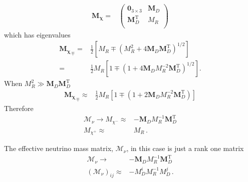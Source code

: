 \begin{align}
  \boldsymbol{M_{\chi}}=& \begin{pmatrix}
   \mathbf{0}_{3 \times 3} &            \boldsymbol{M}_D \\
   \boldsymbol{M}_D^{\operatorname{T}} & M_R \\
 \end{pmatrix}
\end{align}
which has eigenvalues
\begin{align}
{  \boldsymbol{M_{\chi}}}_\mp=&\frac{1}{2} \left[ M_R \mp \left( M_R^2 + 4   \boldsymbol{M}_D   \boldsymbol{M}_D^{\operatorname{T}}  \right)^{1/2} \right] \nonumber\\
  =&\frac{1}{2} M_R\left[ 1 \mp  \left( 1 + 4   \boldsymbol{M}_D M_R^{-2}   \boldsymbol{M}_D ^{\operatorname{T}}  \right)^{1/2} \right].
\end{align}
When $M_R^2 \gg \boldsymbol{M}_D  \boldsymbol{M}_D ^{\operatorname{T}} $
\begin{align}
  { \boldsymbol{M_{\chi}}}_\mp\approx &\frac{1}{2} M_R\left[ 1 \mp  \left( 1 +   2 \boldsymbol{M}_D M_R^{-2}   \boldsymbol{M}_D^{\operatorname{T}}  \right)
   \right]
\end{align}
Therefore
\begin{align}
 \boldsymbol{\mathcal{M}}_{\nu}\to {M_{\chi^-} }\approx&-   \boldsymbol{M}_D M_R^{-1}   \boldsymbol{M}_D^{\operatorname{T}}  \nonumber\\
 M_{\chi^+} \approx&    M_R\,.
\end{align}

The effective neutrino mass matrix, $\boldsymbol{\mathcal{M}}_{\nu}$,  in this case   is just a rank one matrix
\begin{align}
  \boldsymbol{\mathcal{M}}_{\nu}\to&- \boldsymbol{M}_D M_R^{-1} \boldsymbol{M}_D^{\operatorname{T}}\nonumber\\
  \left( {\mathcal{M}}_{\nu} \right)_{ij}\approx&- M_D^i M_R^{-1} M_D^{j}\,.
\end{align}

